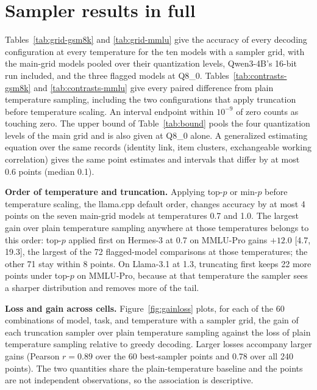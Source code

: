 \documentclass[11pt]{article}
\begin{document}
\begin{table}[p]\centering
\caption{Plain-temperature accuracy drop at each sweep temperature against the model's own
$T{=}0.7$ accuracy in the main grid (pp, 95\% item-clustered intervals; Q8\_0).}
\label{tab:ladder}
\footnotesize\setlength{\tabcolsep}{6pt}
\end{table}

\section{Sampler results in full}
\label{app:sampler}

Tables~\ref{tab:grid-gsm8k} and \ref{tab:grid-mmlu} give the accuracy of every decoding
configuration at every temperature for the ten models with a sampler grid, with the main-grid
models pooled over their quantization levels, Qwen3-4B's 16-bit run included, and the three
flagged models at Q8\_0.
Tables~\ref{tab:contrasts-gsm8k} and \ref{tab:contrasts-mmlu} give every paired difference
from plain temperature sampling, including the two configurations that apply truncation before
temperature scaling. An interval endpoint within $10^{-9}$ of zero counts as touching zero.
The upper bound of Table~\ref{tab:bound} pools the four quantization levels of the main grid
and is also given at Q8\_0 alone. A generalized estimating equation over the same records
(identity link, item clusters, exchangeable working correlation) gives the same point
estimates and intervals that differ by at most 0.6 points (median 0.1).


\textbf{Order of temperature and truncation.} Applying top-$p$ or min-$p$ before temperature
scaling, the llama.cpp default order, changes accuracy by at most 4 points on the seven
main-grid models at temperatures 0.7 and 1.0. The largest gain over plain temperature sampling
anywhere at those temperatures belongs to this order: top-$p$ applied first on Hermes-3 at 0.7
on MMLU-Pro gains $+12.0$ [4.7, 19.3], the largest of the 72 flagged-model comparisons at those
temperatures; the other 71 stay within 8 points. On Llama-3.1 at 1.3, truncating first keeps 22 more points
under top-$p$ on MMLU-Pro, because at that temperature the sampler sees a sharper distribution
and removes more of the tail.


\textbf{Loss and gain across cells.} Figure~\ref{fig:gainloss} plots, for each of the 60
combinations of model, task, and temperature with a sampler grid, the gain of each truncation
sampler over plain temperature sampling against the loss of plain temperature sampling relative
to greedy decoding. Larger losses accompany larger gains (Pearson $r{=}0.89$ over the 60
best-sampler points and 0.78 over all 240 points). The two quantities share the
plain-temperature baseline and the points are not independent observations, so the
association is descriptive.
\end{document}
